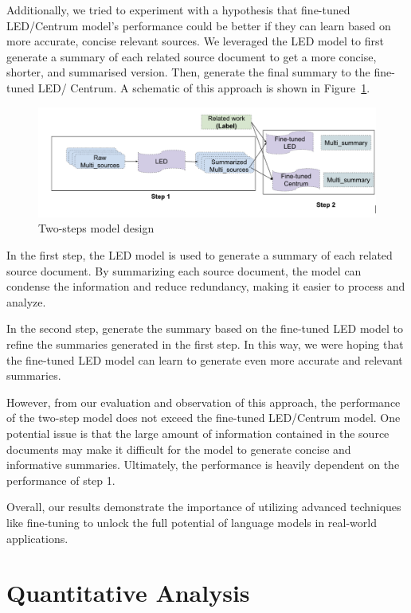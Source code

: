\documentclass[12pt, twocolumn]{article}
\numberwithin{equation}{section}
\begin{document}
Additionally, we tried to experiment with a hypothesis that fine-tuned LED/Centrum model's performance could be better if they can learn based on more accurate, concise relevant sources. We leveraged the LED model to first generate a summary of each related source document to get a more concise, shorter, and summarised version. Then, generate the final summary to the fine-tuned LED/ Centrum. A schematic of this approach is shown in Figure~\ref{fig:two-steps}.

\begin{figure}
    \includegraphics[width=\textwidth]{two_steps.png}
    \caption{Two-steps model design}
    \label{fig:two-steps}
\end{figure}

In the first step, the LED model is used to generate a summary of each related source document. By summarizing each source document, the model can condense the information and reduce redundancy, making it easier to process and analyze.

In the second step, generate the summary based on the fine-tuned LED model to refine the summaries generated in the first step. In this way, we were hoping that the fine-tuned LED model can learn to generate even more accurate and relevant summaries.

However, from our evaluation and observation of this approach, the performance of the two-step model does not exceed the fine-tuned LED/Centrum model. One potential issue is that the large amount of information contained in the source documents may make it difficult for the model to generate concise and informative summaries. Ultimately, the performance is heavily dependent on the performance of step 1.

Overall, our results demonstrate the importance of utilizing advanced techniques like fine-tuning to unlock the full potential of language models in real-world applications.

\section{Quantitative Analysis}
\label{sec:quantitative}
\end{document}
